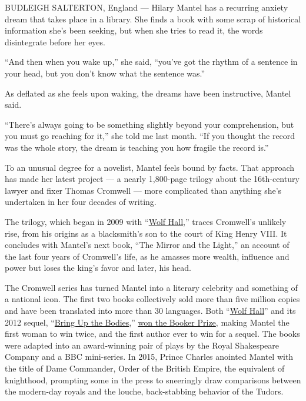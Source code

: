 BUDLEIGH SALTERTON, England --- Hilary Mantel has a recurring anxiety
dream that takes place in a library. She finds a book with some scrap of
historical information she's been seeking, but when she tries to read
it, the words disintegrate before her eyes.

``And then when you wake up,'' she said, ``you've got the rhythm of a
sentence in your head, but you don't know what the sentence was.''

As deflated as she feels upon waking, the dreams have been instructive,
Mantel said.

``There's always going to be something slightly beyond your
comprehension, but you must go reaching for it,'' she told me last
month. ``If you thought the record was the whole story, the dream is
teaching you how fragile the record is.''

To an unusual degree for a novelist, Mantel feels bound by facts. That
approach has made her latest project --- a nearly 1,800-page trilogy
about the 16th-century lawyer and fixer Thomas Cromwell --- more
complicated than anything she's undertaken in her four decades of
writing.

The trilogy, which began in 2009 with
``\href{https://www.nytimes.com/2009/10/05/books/05maslin.html}{Wolf
Hall},'' traces Cromwell's unlikely rise, from his origins as a
blacksmith's son to the court of King Henry VIII. It concludes with
Mantel's next book, ``The Mirror and the Light,'' an account of the last
four years of Cromwell's life, as he amasses more wealth, influence and
power but loses the king's favor and later, his head.

The Cromwell series has turned Mantel into a literary celebrity and
something of a national icon. The first two books collectively sold more
than five million copies and have been translated into more than 30
languages. Both
``\href{https://www.nytimes.com/2009/11/01/books/review/Benfey-t.html}{Wolf
Hall}'' and its 2012 sequel,
``\href{https://www.nytimes.com/2012/05/02/books/bring-up-the-bodies-a-wolf-hall-sequel-by-hilary-mantel.html}{Bring
Up the Bodies},''
\href{https://artsbeat.blogs.nytimes.com/2012/10/16/hilary-mantel-wins-a-second-booker-prize/}{won
the Booker Prize}, making Mantel the first woman to win twice, and the
first author ever to win for a sequel. The books were adapted into an
award-winning pair of plays by the Royal Shakespeare Company and a BBC
mini-series. In 2015, Prince Charles anointed Mantel with the title of
Dame Commander, Order of the British Empire, the equivalent of
knighthood, prompting some in the press to sneeringly draw comparisons
between the modern-day royals and the louche, back-stabbing behavior of
the Tudors.

